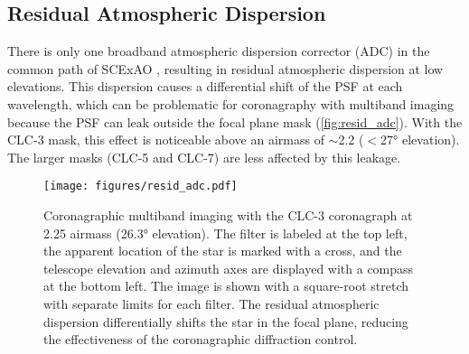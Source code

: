 \subsection{Residual Atmospheric Dispersion}

There is only one broadband atmospheric dispersion corrector (ADC) in the common path of SCExAO \citep{egner_atmospheric_2010}, resulting in residual atmospheric dispersion at low elevations. This dispersion causes a differential shift of the PSF at each wavelength, which can be problematic for coronagraphy with multiband imaging because the PSF can leak outside the focal plane mask (\autoref{fig:resid_adc}). With the CLC-3 mask, this effect is noticeable above an airmass of $\sim$\num{2.2} ($<$\ang{27} elevation). The larger masks (CLC-5 and CLC-7) are less affected by this leakage.

\begin{figure}
    \centering
    \texttt{[image: figures/resid\_adc.pdf]}
    \caption{Coronagraphic multiband imaging with the CLC-3 coronagraph at 2.25 airmass (\ang{26.3} elevation). The filter is labeled at the top left, the apparent location of the star is marked with a cross, and the telescope elevation and azimuth axes are displayed with a compass at the bottom left. The image is shown with a square-root stretch with separate limits for each filter. The residual atmospheric dispersion differentially shifts the star in the focal plane, reducing the effectiveness of the coronagraphic diffraction control.\label{fig:resid_adc}}
\end{figure}
